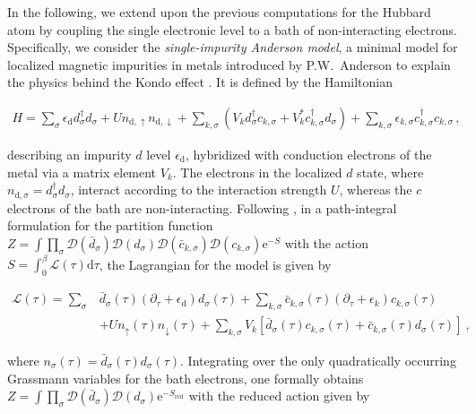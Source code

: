 \documentclass{SciPost}
\begin{document}
In the following, we extend upon the previous computations for the Hubbard atom by coupling the single electronic level to a bath of non-interacting electrons. Specifically, we consider the \textsl{single-impurity Anderson model}, a minimal model for localized magnetic impurities in metals introduced by P.W.~Anderson to explain the physics behind the Kondo effect \cite{anderson_localized_1961}. It is defined by the Hamiltonian
%
\begin{linenomath}
    \begin{align}
        H=\sum_\sigma \epsilon_{\mathrm{d}} d_\sigma^{\dagger} d_\sigma+U n_{\mathrm{d}, \uparrow} n_{\mathrm{d}, \downarrow}+\sum_{k, \sigma}\left(V_k d_\sigma^{\dagger} c_{k, \sigma}+V_k^* c_{k, \sigma}^{\dagger} d_\sigma\right)+\sum_{k, \sigma} \epsilon_{k, \sigma} c_{k, \sigma}^{\dagger} c_{k, \sigma}\, ,
    \end{align}
\end{linenomath}
%
describing an impurity $d$ level $\epsilon_{\mathrm{d}}$, hybridized with conduction electrons of the metal via a matrix element $V_k$. The electrons in the localized $d$ state, where $n_{\mathrm{d}, \sigma}=d_\sigma^{\dagger} d_\sigma$, interact according to the interaction strength $U$, whereas the $c$ electrons of the bath are non-interacting. Following \cite{hewson_renormalized_2001}, in a path-integral formulation for the partition function $Z=\int \prod_\sigma \mathcal{D}\left(\bar{d}_\sigma\right) \mathcal{D}\left(d_\sigma\right) \mathcal{D}\left(\bar{c}_{k, \sigma}\right) \mathcal{D}\left(c_{k, \sigma}\right) \mathrm{e}^{-S}$ with the action $S=\int_0^\beta \mathcal{L}(\tau) \mathrm{d} \tau$, the Lagrangian for the model is given by 
%
\begin{linenomath}
    \begin{align}
    \mathcal{L}(\tau)=\sum_\sigma & \bar{d}_\sigma(\tau)\left(\partial_\tau+\epsilon_{\mathrm{d}}\right) d_\sigma(\tau)+\sum_{k, \sigma} \bar{c}_{k, \sigma}(\tau)\left(\partial_\tau+\epsilon_k\right) c_{k, \sigma}(\tau) \nonumber \\
    & +U n_{\uparrow}(\tau) n_{\downarrow}(\tau)+\sum_{k,\sigma} V_k\left[\bar{d}_\sigma(\tau) c_{k, \sigma}(\tau)+\bar{c}_{k, \sigma}(\tau) d_\sigma(\tau)\right]\ ,
    \end{align}
\end{linenomath}
%
where $n_\sigma(\tau)=\bar{d}_\sigma(\tau) d_\sigma(\tau)$. Integrating over the only quadratically occurring Grassmann variables for the bath electrons, one formally obtains $Z=\int \prod_\sigma \mathcal{D}\left(\bar{d}_\sigma\right) \mathcal{D}\left(d_\sigma\right) \mathrm{e}^{-S_{\text{red}}}$ with the reduced action given by
\end{document}
